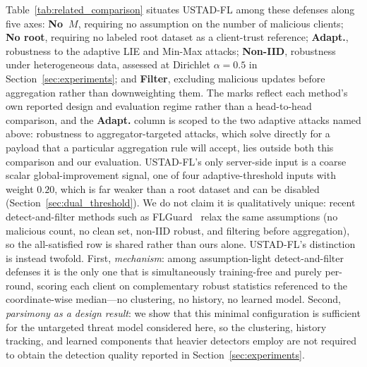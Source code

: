 \documentclass[journal]{IEEEtran}
\begin{document}
Table~\ref{tab:related_comparison} situates USTAD-FL among these defenses along five axes: \textbf{No~$M$}, requiring no assumption on the number of malicious clients; \textbf{No root}, requiring no labeled root dataset as a client-trust reference; \textbf{Adapt.}, robustness to the adaptive LIE and Min-Max attacks; \textbf{Non-IID}, robustness under heterogeneous data, assessed at Dirichlet $\alpha=0.5$ in Section~\ref{sec:experiments}; and \textbf{Filter}, excluding malicious updates before aggregation rather than downweighting them. The marks reflect each method's own reported design and evaluation regime rather than a head-to-head comparison, and the \textbf{Adapt.} column is scoped to the two adaptive attacks named above: robustness to aggregator-targeted attacks, which solve directly for a payload that a particular aggregation rule will accept, lies outside both this comparison and our evaluation. USTAD-FL's only server-side input is a coarse scalar global-improvement signal, one of four adaptive-threshold inputs with weight $0.20$, which is far weaker than a root dataset and can be disabled (Section~\ref{sec:dual_threshold}). We do not claim it is qualitatively unique: recent detect-and-filter methods such as FLGuard~\cite{lee2023flguard} relax the same assumptions (no malicious count, no clean set, non-IID robust, and filtering before aggregation), so the all-satisfied row is shared rather than ours alone. USTAD-FL's distinction is instead twofold. First, \emph{mechanism}: among assumption-light detect-and-filter defenses it is the only one that is simultaneously training-free and purely per-round, scoring each client on complementary robust statistics referenced to the coordinate-wise median---no clustering, no history, no learned model. Second, \emph{parsimony as a design result}: we show that this minimal configuration is sufficient for the untargeted threat model considered here, so the clustering, history tracking, and learned components that heavier detectors employ are not required to obtain the detection quality reported in Section~\ref{sec:experiments}.
\end{document}
